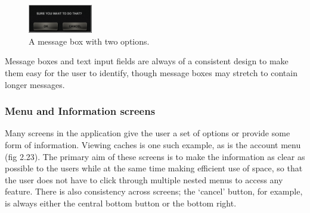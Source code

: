 \begin{figure}
	\vspace{-30pt}
	\begin{center}
	\includegraphics[width=0.25\textwidth]{images/message_box_question_mockup}
	\caption{A message box with two options.}
	\label{message_box_two_options}
	\end{center}
	\vspace{-30pt}
\end{figure}

Message boxes and text input fields are always of a consistent design to make them easy for the user to identify, though message boxes may stretch to contain longer messages.

\subsubsection{Menu and Information screens}

Many screens in the application give the user a set of options or provide some form of information. Viewing caches is one such example, as is the account menu (fig 2.23). The primary aim of these screens is to make the information as clear as possible to the users while at the same time making efficient use of space, so that the user does not have to click through multiple nested menus to access any feature. There is also consistency across screens; the ‘cancel’ button, for example, is always either the central bottom button or the bottom right.

